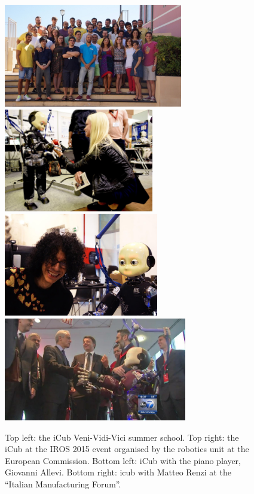 \begin{enumerate}
\begin{figure}[!t]
	\begin{center}
		\includegraphics[height=4.5cm]{images/vvv.jpg}
		\includegraphics[height=4.5cm]{images/iros.jpg}
        \includegraphics[height=4.5cm]{images/allevi.jpg}
        \includegraphics[height=4.5cm]{images/renzi.jpg}
		\caption{Top left: the iCub Veni-Vidi-Vici summer school. Top right: the iCub at the IROS 2015 event organised by the robotics unit at the European Commission. Bottom left: iCub with the piano player, Giovanni Allevi. Bottom right: icub with Matteo Renzi at the ``Italian Manufacturing Forum''. }
		\label{fig:vvv}
	\end{center}
\end{figure}


\end{enumerate}
